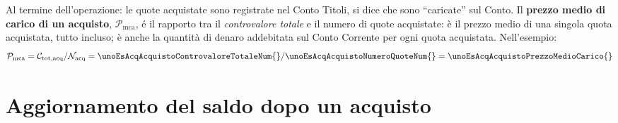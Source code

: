 \documentclass[12pt,a4paper]{article}
\newcommand{\Virgolette}[1]{``#1''}
\newcommand{\Nacq}[1]{\mathcal{N}_{\textrm{acq}#1}}
\newcommand{\Pmc}[1]{\mathcal{P}_{\mathrm{mc}#1}}
\newcommand{\Pmca}[1]{\Pmc{\mathrm{a}#1}}
\newcommand{\Ctotacq}[1]{\mathcal{C}_{\mathrm{tot,acq}#1}}
\begin{document}
Al termine dell'operazione: le  quote acquistate sono registrate nel Conto Titoli,  si dice che sono
\Virgolette{caricate} sul Conto.  Il \textbf{prezzo medio  di carico di un acquisto}, \(\Pmca{}\), é
il rapporto tra il \emph{controvalore totale} e il  numero di quote acquistate: è il prezzo medio di
una singola  quota acquistata, tutto  incluso; è  anche la quantità  di denaro addebitata  sul Conto
Corrente per ogni quota acquistata.  Nell'esempio:
\begin{equation*}
  \Pmca{}
  = \Ctotacq{} / \Nacq{}
  = \unoEsAcqAcquistoControvaloreTotaleNum{} / \unoEsAcqAcquistoNumeroQuoteNum{}
  = \unoEsAcqAcquistoPrezzoMedioCarico{}
\end{equation*}


\section{Aggiornamento del saldo dopo un acquisto}


\end{document}
